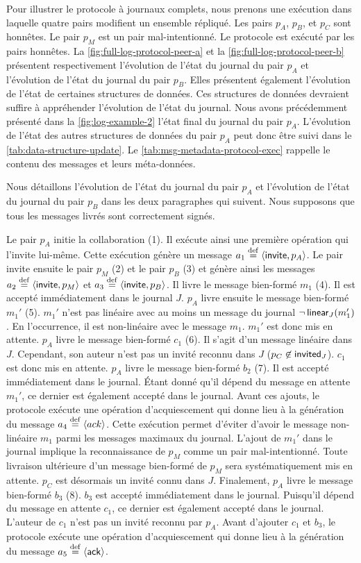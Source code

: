 Pour illustrer le protocole à journaux complets, nous prenons une exécution dans laquelle quatre pairs modifient un ensemble répliqué.
Les pairs $p_A$, $p_B$, et $p_C$ sont honnêtes.
Le pair $p_M$ est un pair mal-intentionné.
Le protocole est exécuté par les pairs honnêtes.
La \autoref{fig:full-log-protocol-peer-a} et la \autoref{fig:full-log-protocol-peer-b} présentent respectivement l'évolution de l'état du journal du pair $p_A$ et l'évolution de l'état du journal du pair $p_B$.
Elles présentent également l'évolution de l'état de certaines structures de données.
Ces structures de données devraient suffire à appréhender l'évolution de l'état du journal.
Nous avons précédemment présenté dans la \autoref{fig:log-example-2} l'état final du journal du pair $p_A$.
L'évolution de l'état des autres structures de données du pair $p_A$ peut donc être suivi dans le \autoref{tab:data-structure-update}.
Le \autoref{tab:msg-metadata-protocol-exec} rappelle le contenu des messages et leurs méta-données.

Nous détaillons l'évolution de l'état du journal du pair $p_A$ et l'évolution de l'état du journal du pair $p_B$ dans les deux paragraphes qui suivent.
Nous supposons que tous les messages livrés sont correctement signés.

Le pair $p_A$ initie la collaboration (1).
Il exécute ainsi une première opération qui l'invite lui-même.
Cette exécution génère un message $a_1 \defeq \tuple*{\trm{invite}, p_A}$.
Le pair invite ensuite le pair $p_M$ (2) et le pair $p_B$ (3) et génère ainsi les messages $a_2 \defeq \tuple*{\trm{invite}, p_M}$ et $a_3 \defeq \tuple*{\trm{invite}, p_B}$.
Il livre le message bien-formé $m_1$ (4).
Il est accepté immédiatement dans le journal $J$.
$p_A$ livre ensuite le message bien-formé $m_1'$ (5).
$m_1'$ n'est pas linéaire avec au moins un message du journal $\neg \trm{linear}_J(m_1')$.
En l'occurrence, il est non-linéaire avec le message $m_1$.
$m_1'$ est donc mis en attente.
$p_A$ livre le message bien-formé $c_1$ (6).
Il s'agit d'un message linéaire dans $J$.
Cependant, son auteur n'est pas un invité reconnu dans $J$ ($p_C \not\in \trm{invited}_J$).
$c_1$ est donc mis en attente.
$p_A$ livre le message bien-formé $b_2$ (7).
Il est accepté immédiatement dans le journal.
Étant donné qu'il dépend du message en attente $m_1'$, ce dernier est également accepté dans le journal.
Avant ces ajouts, le protocole exécute une opération d'acquiescement qui donne lieu à la génération du message $a_4 \defeq \tuple*{ack}$.
Cette exécution permet d'éviter d'avoir le message non-linéaire $m_1$ parmi les messages maximaux du journal.
L'ajout de $m_1'$ dans le journal implique la reconnaissance de $p_M$ comme un pair mal-intentionné.
Toute livraison ultérieure d'un message bien-formé de $p_M$ sera systématiquement mis en attente.
$p_C$ est désormais un invité connu dans $J$.
Finalement, $p_A$ livre le message bien-formé $b_3$ (8).
$b_3$ est accepté immédiatement dans le journal.
Puisqu'il dépend du message en attente $c_1$, ce dernier est également accepté dans le journal.
L'auteur de $c_1$ n'est pas un invité reconnu par $p_A$.
Avant d'ajouter $c_1$ et $b_3$, le protocole exécute une opération d'acquiescement qui donne lieu à la génération du message $a_5 \defeq \tuple*{\trm{ack}}$.

